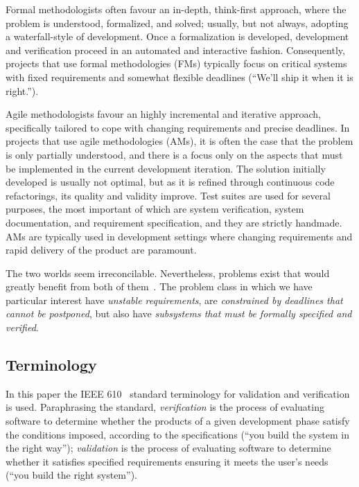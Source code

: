 \documentclass[english]{lni}
\begin{document}
Formal methodologists often favour an in-depth, think-first approach,
where the problem is understood, formalized, and solved; usually, but
not always, adopting a waterfall-style of development.  Once a
formalization is developed, development and verification proceed in an
automated and interactive fashion.  Consequently, projects that use
formal methodologies (FMs) typically focus on critical systems with
fixed requirements and somewhat flexible deadlines (``We'll ship it
when it is right.'').

Agile methodologists favour an highly incremental and iterative
approach, specifically tailored to cope with changing requirements and
precise deadlines.  In projects that use agile methodologies (AMs), it
is often the case that the problem is only partially understood, and
there is a focus only on the aspects that must be implemented in the
current development iteration.  The solution initially developed is
usually not optimal, but as it is refined through continuous code
refactorings, its quality and validity improve.  Test suites are used
for several purposes, the most important of which are system
verification, system documentation, and requirement specification, and
they are strictly handmade.  AMs are typically used in development
settings where changing requirements and rapid delivery of the product
are paramount.

The two worlds seem irreconcilable.  Nevertheless, problems exist that
would greatly benefit from both of them~\cite{Black2009}.  The problem
class in which we have particular interest have \emph{unstable
  requirements}, are \emph{constrained by deadlines that cannot be
  postponed}, but also have \emph{subsystems that must be formally
  specified and verified}.

\subsection{Terminology}
\label{sec:terminology}

In this paper the IEEE 610~\cite{Jay1990} standard terminology for
validation and verification is used.  Paraphrasing the standard,
\emph{verification} is the process of evaluating software to determine
whether the products of a given development phase satisfy the
conditions imposed, according to the specifications (``you build the
system in the right way''); \emph{validation} is the process of
evaluating software to determine whether it satisfies specified
requirements ensuring it meets the user's needs (``you build the right
system'').
\end{document}
